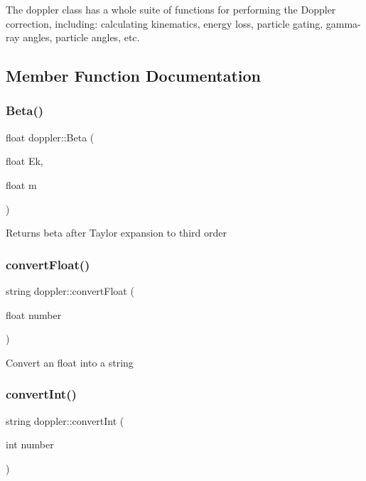 The doppler class has a whole suite of functions for performing the Doppler correction, including\+: calculating kinematics, energy loss, particle gating, gamma-\/ray angles, particle angles, etc. 

\subsection{Member Function Documentation}
\mbox{\label{classdoppler_a28eb084d224fdb58fda1d6f6c61dd232}} 
\subsubsection{\texorpdfstring{Beta()}{Beta()}}
{\footnotesize\ttfamily float doppler\+::\+Beta (\begin{DoxyParamCaption}\item[{float}]{Ek,  }\item[{float}]{m }\end{DoxyParamCaption})}

Returns beta after Taylor expansion to third order \mbox{\label{classdoppler_a0fa8eec8989c81e59ecfb8e09140020c}} 
\subsubsection{\texorpdfstring{convert\+Float()}{convertFloat()}}
{\footnotesize\ttfamily string doppler\+::convert\+Float (\begin{DoxyParamCaption}\item[{float}]{number }\end{DoxyParamCaption})\hspace{0.3cm}{\ttfamily [static]}}

Convert an float into a string \mbox{\label{classdoppler_a100e363bf80b5371baebb89bbf60b824}} 
\subsubsection{\texorpdfstring{convert\+Int()}{convertInt()}}
{\footnotesize\ttfamily string doppler\+::convert\+Int (\begin{DoxyParamCaption}\item[{int}]{number }\end{DoxyParamCaption})\hspace{0.3cm}{\ttfamily [static]}}

